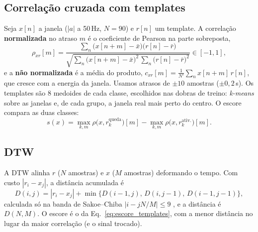 \documentclass[12pt,a4paper]{article}
\newcommand{\amag}{|a|}
\begin{document}
\subsection{Correlação cruzada com templates}
Seja $x[n]$ a janela ($\amag$ a 50\,Hz, $N=90$) e $r[n]$ um template. A correlação
\textbf{normalizada} no atraso $m$ é o coeficiente de Pearson na parte sobreposta,
\begin{equation}\label{eq:corr_norm}
  \rho_{xr}[m]=\frac{\sum_n\bigl(x[n+m]-\bar x\bigr)\bigl(r[n]-\bar r\bigr)}
  {\sqrt{\sum_n\bigl(x[n+m]-\bar x\bigr)^2\,\sum_n\bigl(r[n]-\bar r\bigr)^2}}\in[-1,1],
\end{equation}
e a \textbf{não normalizada} é a média do produto, $c_{xr}[m]=\frac1{N'}\sum_n
x[n+m]\,r[n]$, que cresce com a energia da janela. Usamos atrasos de $\pm10$ amostras
($\pm0{,}2$\,s). Os templates são 8 medoides de cada classe, escolhidos nas dobras de
treino: \emph{k-means} sobre as janelas e, de cada grupo, a janela real mais perto do
centro. O escore compara as duas classes:
\begin{equation}\label{eq:escore_templates}
  s(x)=\max_{k,m}\rho\bigl(x,r^{\text{queda}}_k\bigr)[m]-\max_{k,m}\rho\bigl(x,r^{\text{ativ.}}_k\bigr)[m].
\end{equation}

\subsection{DTW}
A DTW alinha $r$ ($N$ amostras) e $x$ ($M$ amostras) deformando o tempo. Com custo
$|r_i-x_j|$, a distância acumulada é
\begin{equation}\label{eq:dtw}
  D(i,j)=|r_i-x_j|+\min\bigl\{D(i-1,j),\,D(i,j-1),\,D(i-1,j-1)\bigr\},
\end{equation}
calculada só na banda de Sakoe--Chiba $|i-jN/M|\le9$ \cite{sakoe}, e a distância é
$D(N,M)$. O escore é o da Eq.~\eqref{eq:escore_templates}, com a menor distância no
lugar da maior correlação (e o sinal trocado).
\end{document}
